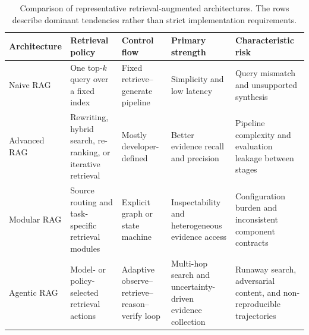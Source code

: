 \begin{table}[t]
\centering
\caption{Comparison of representative retrieval-augmented architectures. The rows describe dominant tendencies rather than strict implementation requirements.}
\label{tab:rag-evolution}
\small
\surveytableformat
\begin{tabularx}{\textwidth}{L{2.3cm}Y Y Y Y}
\toprule
{}\textbf{Architecture} & \textbf{Retrieval policy} & \textbf{Control flow} & \textbf{Primary strength} & \textbf{Characteristic risk} \\
\midrule
Naive RAG & One top-$k$ query over a fixed index & Fixed retrieve--generate pipeline & Simplicity and low latency & Query mismatch and unsupported synthesis \\
Advanced RAG & Rewriting, hybrid search, re-ranking, or iterative retrieval & Mostly developer-defined & Better evidence recall and precision & Pipeline complexity and evaluation leakage between stages \\
Modular RAG & Source routing and task-specific retrieval modules & Explicit graph or state machine & Inspectability and heterogeneous evidence access & Configuration burden and inconsistent component contracts \\
Agentic RAG & Model- or policy-selected retrieval actions & Adaptive observe--retrieve--reason--verify loop & Multi-hop search and uncertainty-driven evidence collection & Runaway search, adversarial content, and non-reproducible trajectories \\
\bottomrule
\end{tabularx}
\end{table}


